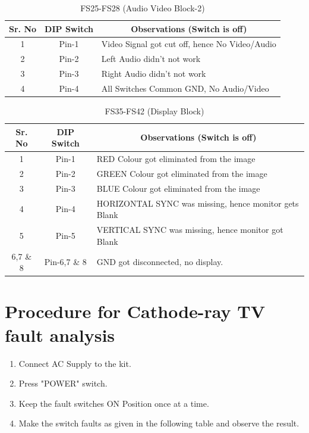 \documentclass[a4paper,12pt]{article}
\begin{document}
		
	\begin{table}[H]
	\centering
	\caption{FS25-FS28 (Audio Video Block-2)}
	\begin{tabular}{|c|c|l|}
		\hline
		\textbf{Sr. No} & \textbf{DIP Switch} & \multicolumn{1}{c|}{\textbf{Observations (Switch is off)}} \\
		\hline
		1 & Pin-1 & Video Signal got cut off, hence No Video/Audio \\
		\hline
		2 & Pin-2 & Left Audio didn't not work \\
		\hline
		3 & Pin-3 & Right Audio didn't not work \\
		\hline
		4 & Pin-4 & All Switches Common GND, No Audio/Video \\
		\hline
	\end{tabular}
	
	\end{table}

\begin{table}[H]

\centering
\caption{FS35-FS42 (Display Block)}
\begin{tabular}{|c|c|l|}
	\hline
	\textbf{Sr. No} & \textbf{DIP Switch} & \multicolumn{1}{c|}{\textbf{Observations (Switch is off)}} \\
	\hline
	1 & Pin-1 & RED Colour got eliminated from the image \\
	\hline
	2 & Pin-2 & GREEN Colour got eliminated from the image \\
	\hline
	3 & Pin-3 & BLUE Colour got eliminated from the image \\
	\hline
	4 & Pin-4 & HORIZONTAL SYNC was missing, hence monitor gets Blank \\
	\hline
	5 & Pin-5 & VERTICAL SYNC was missing, hence monitor got Blank \\
	\hline
	6,7 \& 8 & Pin-6,7 \& 8 & GND  got disconnected, no display. \\
	\hline
\end{tabular}

\end{table}
	
	
\newpage
\section{Procedure for Cathode-ray TV fault analysis}
\begin{enumerate}
	\item Connect AC Supply to the kit.
	\item Press "POWER" switch.
	\item Keep the fault switches ON Position once at a time.
	\item Make the switch faults as given in the following table and observe the result.
\end{enumerate}
\end{document}
